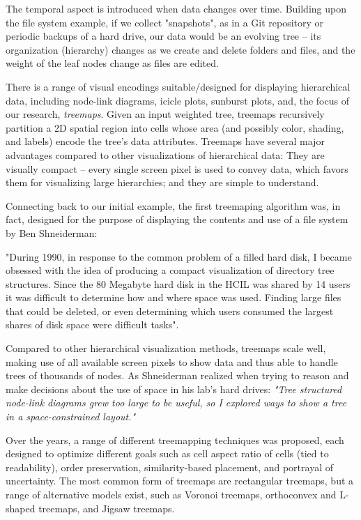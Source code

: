 The temporal aspect is introduced when data changes over time. Building upon the file system example, if we collect "snapshots", as in a Git repository or periodic backups of a hard drive, our data would be an evolving tree -- its organization (hierarchy) changes as we create and delete folders and files, and the weight of the leaf nodes change as files are edited.

There is a range of visual encodings suitable/designed for displaying hierarchical data, including node-link diagrams, icicle plots, sunburst plots, and, the focus of our research, \emph{treemaps}.
Given an input weighted tree, treemaps recursively partition a 2D spatial region into cells whose area (and possibly color, shading, and labels) encode the tree's data attributes. Treemaps have several major advantages compared to other visualizations of hierarchical data: They are visually compact -- every single screen pixel is used to convey data, which favors them for visualizing large hierarchies; and they are simple to understand.

Connecting back to our initial example, the first treemaping algorithm was, in fact, designed for the purpose of displaying the contents and use of a file system by Ben Shneiderman:

\begin{quoting}
    "During 1990, in response to the common problem of a filled hard disk, I became obsessed with the idea of producing a compact visualization of directory tree structures. Since the 80 Megabyte hard disk in the HCIL was shared by 14 users it was difficult to determine how and where space was used. Finding large files that could be deleted, or even determining which users consumed the largest shares of disk space were difficult tasks".
\end{quoting}

Compared to other hierarchical visualization methods, treemaps scale well, making use of all available screen pixels to show data and thus able to handle trees of thousands of nodes. As Shneiderman realized when trying to reason and make decisions about the use of space in his lab's hard drives:
\textit{"Tree structured node-link diagrams grew too large to be useful, so I explored ways to show a tree in a space-constrained layout."}

Over the years, a range of different treemapping techniques was proposed, each designed to optimize different goals such as cell aspect ratio of cells (tied to readability), order preservation, similarity-based placement, and portrayal of uncertainty. The most common form of treemaps are rectangular treemaps, but a range of alternative models exist, such as Voronoi treemaps, orthoconvex and L-shaped treemaps, and Jigsaw treemaps.


